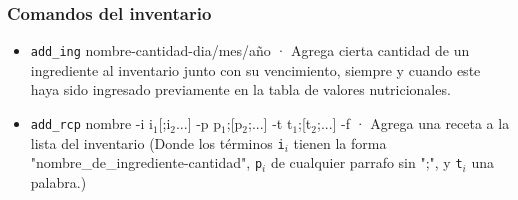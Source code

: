 \documentclass[a4paper]{article}
\begin{document}
\subsubsection*{\small{Comandos del inventario}}
\begin{itemize}
\item \texttt{add\_ing} nombre-cantidad-dia/mes/año · Agrega cierta cantidad de un ingrediente al inventario junto con su vencimiento, siempre y cuando este haya sido ingresado previamente en la tabla de valores nutricionales.
\item \texttt{add\_rcp} nombre -i i$_1$[;i$_2$...] -p p$_1$;[p$_2$;...] -t t$_1$;[t$_2$;...] -f · Agrega una receta a la lista del inventario (Donde los términos \texttt{i$_i$} tienen la forma "nombre\_de\_ingrediente-cantidad", \texttt{p$_i$} de cualquier parrafo sin ";", y \texttt{t$_i$} una palabra.)


\end{itemize}
\end{document}
